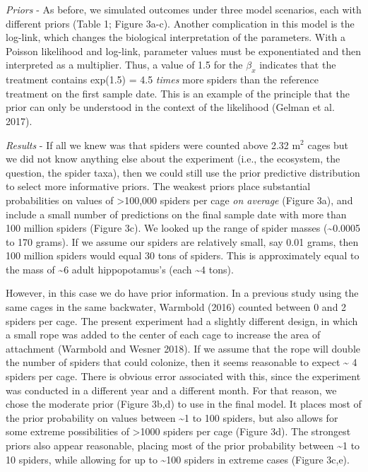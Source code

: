 \documentclass[
  12pt,
]{article}
\begin{document}
\emph{Priors} - As before, we simulated outcomes under three model
scenarios, each with different priors (Table 1; Figure 3a-c). Another
complication in this model is the log-link, which changes the biological
interpretation of the parameters. With a Poisson likelihood and
log-link, parameter values must be exponentiated and then interpreted as
a multiplier. Thus, a value of 1.5 for the \(\beta_x\) indicates that
the treatment contains exp(1.5) = 4.5 \emph{times} more spiders than the
reference treatment on the first sample date. This is an example of the
principle that the prior can only be understood in the context of the
likelihood (Gelman et al. 2017).

\emph{Results} - If all we knew was that spiders were counted above 2.32
m\(^2\) cages but we did not know anything else about the experiment
(i.e., the ecosystem, the question, the spider taxa), then we could
still use the prior predictive distribution to select more informative
priors. The weakest priors place substantial probabilities on values of
\textgreater100,000 spiders per cage \emph{on average} (Figure 3a), and
include a small number of predictions on the final sample date with more
than 100 million spiders (Figure 3c). We looked up the range of spider
masses (\textasciitilde0.0005 to 170 grams). If we assume our spiders
are relatively small, say 0.01 grams, then 100 million spiders would
equal 30 tons of spiders. This is approximately equal to the mass of
\textasciitilde6 adult hippopotamus's (each \textasciitilde4 tons).

However, in this case we do have prior information. In a previous study
using the same cages in the same backwater, Warmbold (2016) counted
between 0 and 2 spiders per cage. The present experiment had a slightly
different design, in which a small rope was added to the center of each
cage to increase the area of attachment (Warmbold and Wesner 2018). If
we assume that the rope will double the number of spiders that could
colonize, then it seems reasonable to expect \textasciitilde{} 4 spiders
per cage. There is obvious error associated with this, since the
experiment was conducted in a different year and a different month. For
that reason, we chose the moderate prior (Figure 3b,d) to use in the
final model. It places most of the prior probability on values between
\textasciitilde1 to 100 spiders, but also allows for some extreme
possibilities of \textgreater1000 spiders per cage (Figure 3d). The
strongest priors also appear reasonable, placing most of the prior
probability between \textasciitilde1 to 10 spiders, while allowing for
up to \textasciitilde100 spiders in extreme cases (Figure 3c,e).
\end{document}
